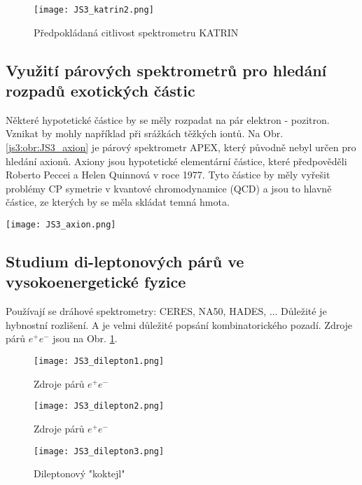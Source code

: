\documentclass[../../main.tex]{subfiles}
\begin{document}
\begin{figure}[h]
	\centering
	\texttt{[image: JS3\_katrin2.png]}
	\caption{Předpokládaná citlivost spektrometru KATRIN}		
\end{figure}

\subsection{Využití párových spektrometrů pro hledání rozpadů exotických částic}

Některé hypotetické částice by se měly rozpadat na pár elektron - pozitron. Vznikat by mohly například při srážkách těžkých iontů. Na Obr. \ref{js3:obr:JS3_axion} je párový spektrometr APEX, který původně nebyl určen pro hledání axionů. Axiony jsou hypotetické elementární částice, které předpověděli Roberto Peccei a Helen Quinnová v roce 1977. Tyto částice by měly vyřešit problémy CP symetrie v kvantové chromodynamice (QCD) a jsou to hlavně částice, ze kterých by se měla skládat temná hmota.

\begin{center}
	\texttt{[image: JS3\_axion.png]}
\end{center}

\subsection{Studium di-leptonových párů ve vysokoenergetické fyzice}

Používají se dráhové spektrometry: CERES, NA50, HADES, ... Důležité je hybnostní rozlišení. A je velmi důležité popsání kombinatorického pozadí. Zdroje párů $e^+ e^- $ jsou na Obr. \ref{js3:obr:JS3_dilepton1}. 

\begin{figure}
	\centering
	\texttt{[image: JS3\_dilepton1.png]}
	\caption{Zdroje párů $e^+ e^-$ \label{js3:obr:JS3_dilepton1}}		
\end{figure}
\begin{figure}
	\centering
	\texttt{[image: JS3\_dilepton2.png]}
	\caption{Zdroje párů $e^+ e^-$ \label{js3:obr:JS3_dilepton2}}		
\end{figure}
\begin{figure}
	\centering
	\texttt{[image: JS3\_dilepton3.png]}
	\caption{Dileptonový "koktejl"\label{js3:obr:JS3_dilepton3}}		
\end{figure}
\end{document}

